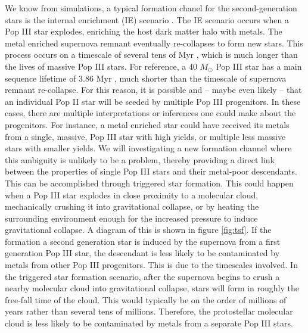 \documentclass[a4paper, 12pt]{article}
\begin{document}
We know from simulations, a typical formation chanel for the second-generation stars is the internal enrichment (IE) scenario \citep{Chiaki2019}. The IE scenario occurs when a Pop III star explodes, enriching the host dark matter halo with metals. The metal enriched supernova remnant eventually re-collapses to form new stars. This process occurs on a timescale of several tens of Myr \citep{Chiaki2019}, which is much longer than the lives of massive Pop III stars. For reference, a 40 $M_\odot$ Pop III star has a main sequence lifetime of 3.86 Myr \citep{Schaerer2002}, much shorter than the timescale of supernova remnant re-collapse. For this reason, it is possible and -- maybe even likely -- that an individual Pop II star will be seeded by multiple Pop III progenitors. In these cases, there are multiple interpretations or inferences one could make about the progenitors. For instance, a metal enriched star could have received its metals from a single, massive, Pop III star with high yields, or multiple less massive stars with smaller yields. We will investigating a new formation channel where this ambiguity is unlikely to be a problem, thereby providing a direct link between the properties of single Pop III stars and their metal-poor descendants. This can be accomplished through triggered star formation. This could happen when a Pop III star explodes in close proximity to a molecular cloud, mechanically crushing it into gravitational collapse, or by heating the surrounding environment enough for the increased pressure to induce gravitational collapse. A diagram of this is shown in figure \ref{fig:tsf}. If the formation a second generation star is induced by the supernova from a first generation Pop III star, the descendant is less likely to be contaminated by metals from other Pop III progenitors. This is due to the timescales involved. In the triggered star formation scenario, after the supernova begins to crush a nearby molecular cloud into gravitational collapse, stars will form in roughly the free-fall time of the cloud. This would typically be on the order of millions of years rather than several tens of millions. Therefore, the protostellar molecular cloud is less likely to be contaminated by metals from a separate Pop III stars. 
\end{document}

